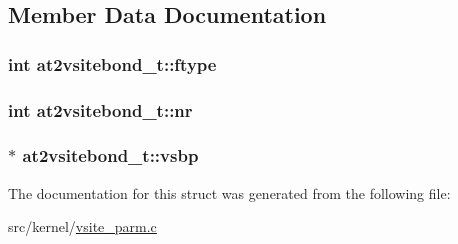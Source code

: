 \subsection{\-Member \-Data \-Documentation}
\hypertarget{structat2vsitebond__t_a1d5c356dbac65dc8c50e7c7c8a98f573}{
\subsubsection[{ftype}]{\setlength{\rightskip}{0pt plus 5cm}int {\bf at2vsitebond\-\_\-t\-::ftype}}}\label{structat2vsitebond__t_a1d5c356dbac65dc8c50e7c7c8a98f573}
\hypertarget{structat2vsitebond__t_ac8170f544d44f22e187bb0eac1d53c1a}{
\subsubsection[{nr}]{\setlength{\rightskip}{0pt plus 5cm}int {\bf at2vsitebond\-\_\-t\-::nr}}}\label{structat2vsitebond__t_ac8170f544d44f22e187bb0eac1d53c1a}
\hypertarget{structat2vsitebond__t_adab970e43ee2e76dc29065414a92ff03}{
\subsubsection[{vsbp}]{$\ast$ {\bf at2vsitebond\-\_\-t\-::vsbp}}}\label{structat2vsitebond__t_adab970e43ee2e76dc29065414a92ff03}


\-The documentation for this struct was generated from the following file\-:\begin{DoxyCompactItemize}
\item 
src/kernel/\hyperlink{vsite__parm_8c}{vsite\-\_\-parm.\-c}\end{DoxyCompactItemize}
